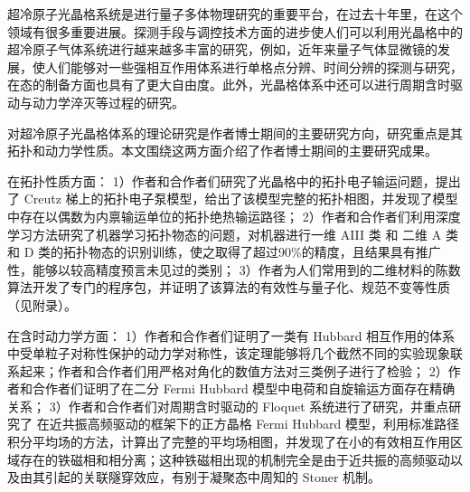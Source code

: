 \begin{cabstract}
超冷原子光晶格系统是进行量子多体物理研究的重要平台，在过去十年里，在这个领域有很多重要进展。探测手段与调控技术方面的进步使人们可以利用光晶格中的超冷原子气体系统进行越来越多丰富的研究，例如，近年来量子气体显微镜的发展，使人们能够对一些强相互作用体系进行单格点分辨、时间分辨的探测与研究，在态的制备方面也具有了更大自由度。此外，光晶格体系中还可以进行周期含时驱动与动力学淬灭等过程的研究。

对超冷原子光晶格体系的理论研究是作者博士期间的主要研究方向，研究重点是其拓扑和动力学性质。本文围绕这两方面介绍了作者博士期间的主要研究成果。

在拓扑性质方面：
1）作者和合作者们研究了光晶格中的拓扑电子输运问题，提出了 Creutz 梯上的拓扑电子泵模型，给出了该模型完整的拓扑相图，并发现了模型中存在以偶数为内禀输运单位的拓扑绝热输运路径；
2）作者和合作者们利用深度学习方法研究了机器学习拓扑物态的问题，对机器进行一维 AIII 类 和 二维 A 类和 D 类的拓扑物态的识别训练，使之取得了超过90\%的精度，且结果具有推广性，能够以较高精度预言未见过的类别；
3）作者为人们常用到的二维材料的陈数算法\cite{chern2005}开发了专门的程序包，并证明了该算法的有效性与量子化、规范不变等性质（见附录）。

在含时动力学方面：
1）作者和合作者们证明了一类有 Hubbard 相互作用的体系中受单粒子对称性保护的动力学对称性，该定理能够将几个截然不同的实验现象\cite{hubbard-expan-2010,hubbard-expan-2012,mbl1d,twobody-2017}联系起来；作者和合作者们用严格对角化的数值方法对三类例子进行了检验；
2）作者和合作者们证明了在二分 Fermi Hubbard 模型中电荷和自旋输运方面存在精确关系；
3）作者和合作者们对周期含时驱动的 Floquet 系统进行了研究，并重点研究了
在近共振高频驱动的框架下的正方晶格 Fermi Hubbard 模型，利用标准路径积分平均场的方法，计算出了完整的平均场相图，并发现了在小的有效相互作用区域存在的铁磁相和相分离；这种铁磁相出现的机制完全是由于近共振的高频驱动以及由其引起的关联隧穿效应，有别于凝聚态中周知的 Stoner 机制。
\end{cabstract}

